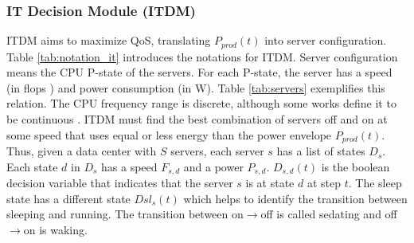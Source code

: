



\subsubsection{IT Decision Module (ITDM)}

ITDM aims to maximize QoS, translating $P_{prod}(t)$ into server configuration. Table \ref{tab:notation_it} introduces the notations for ITDM. Server configuration means the CPU P-state of the servers. For each P-state, the server has a speed (in flops \cite{hunger2005floating}) and power consumption (in W). Table \ref{tab:servers} exemplifies this relation. The CPU frequency range is discrete, although some works define it to be continuous \cite{saha2012experimental}. ITDM must find the best combination of servers off and on at some speed that uses equal or less energy than the power envelope $P_{prod}(t)$. Thus, given a data center with $S$ servers, each server $s$ has a list of states $D_s$. Each state $d$ in $D_s$ has a speed $F_{s,d}$ and a power $P_{s,d}$. $D_{s,d}(t)$ is the boolean decision variable that indicates that the server $s$ is at state $d$ at step $t$. The sleep state has a different state $Dsl_{s}(t)$ which helps to identify the transition between sleeping and running. The transition between on$\rightarrow$off is called sedating and off$\rightarrow$on is waking.

